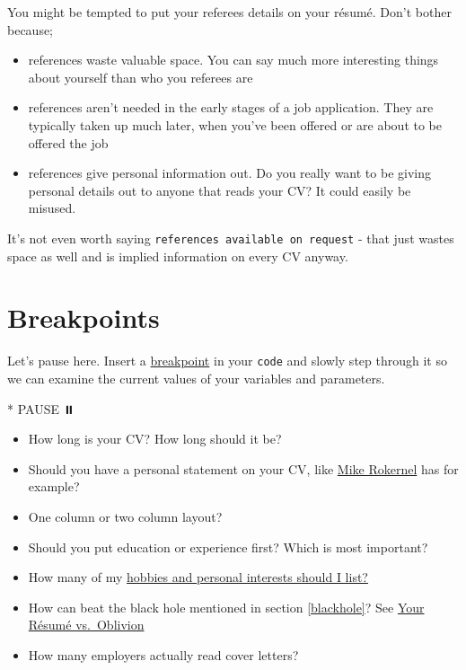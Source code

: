 \documentclass[
]{book}
\newenvironment{Shaded}{\begin{snugshade}}{\end{snugshade}}
\newcommand{\NormalTok}[1]{#1}
\newcommand{\SpecialStringTok}[1]{\textcolor[rgb]{0.31,0.60,0.02}{#1}}
\providecommand{\tightlist}{%
  \setlength{\itemsep}{0pt}\setlength{\parskip}{0pt}}
\begin{document}
You might be tempted to put your referees details on your résumé. Don't bother because;

\begin{itemize}
\tightlist
\item
  references waste valuable space. You can say much more interesting things about yourself than who you referees are
\item
  references aren't needed in the early stages of a job application. They are typically taken up much later, when you've been offered or are about to be offered the job
\item
  references give personal information out. Do you really want to be giving personal details out to anyone that reads your CV? It could easily be misused.
\end{itemize}

It's not even worth saying \texttt{references\ available\ on\ request} - that just wastes space as well and is implied information on every CV anyway.

\hypertarget{bp7}{%
\section{Breakpoints}\label{bp7}}

Let's pause here. Insert a \href{https://en.wikipedia.org/wiki/Breakpoint}{breakpoint} in your \texttt{code} and slowly step through it so we can examine the current values of your variables and parameters.

\begin{Shaded}
\begin{Highlighting}[]
\SpecialStringTok{* }\NormalTok{PAUSE ⏸️}
\end{Highlighting}
\end{Shaded}

\begin{itemize}
\tightlist
\item
  How long is your CV? How long should it be?
\item
  Should you have a personal statement on your CV, like \href{https://www.cdyf.me/Mike_Rokernel.pdf}{Mike Rokernel} has for example?
\item
  One column or two column layout?
\item
  Should you put education or experience first? Which is most important?
\item
  How many of my \href{https://www.reed.co.uk/career-advice/hobbies-and-interests-should-i-include-them-in-my-cv}{hobbies and personal interests should I list?} \citep{hobbies}
\item
  How can beat the black hole mentioned in section \ref{blackhole}? See \href{https://www.wsj.com/articles/SB10001424052970204624204577178941034941330}{Your Résumé vs.~Oblivion} \citep{oblivion}
\item
  How many employers actually read cover letters?
\end{itemize}
\end{document}
